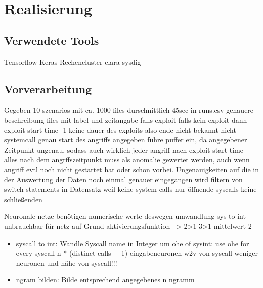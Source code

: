 
\chapter{Realisierung}\label{ch:realisierung}

\section{Verwendete Tools}
    Tensorflow Keras
    Rechencluster clara
    sysdig

\section{Vorverarbeitung}

    Gegeben 10 szenarios mit ca. 1000 files durschnittlich 45sec
    in runs.csv genauere beschreibung files mit label und zeitangabe falls exploit
    falls kein exploit dann exploit start time -1
    keine dauer des exploits also ende nicht bekannt 
    nicht systemcall genau start des angriffs angegeben 
    führe puffer ein, da angegebener Zeitpunkt ungenau, sodass auch wirklich jeder angriff nach exploit start time
    alles nach dem angrffszeitpunkt muss als anomalie gewertet werden, auch wenn angriff evtl noch nicht gestartet hat oder schon vorbei.
    Ungenauigkeiten auf die in der Auswertung der Daten noch einmal genauer eingegangen wird
    filtern von switch statements in Datensatz weil keine system calls
    nur öffnende syscalls keine schließenden

    Neuronale netze benötigen numerische werte deswegen umwandlung
    sys to int unbrauchbar für netz auf Grund aktivierungsfunktion --> 2>1 3>1 mittelwert 2
    \begin{itemize}
        \item syscall to int: Wandle Syscall name in Integer um
        \subitem ohe of sysint: use ohe for every syscall 
         n * (distinct calls + 1) eingabeneuronen 
        \subitem w2v von syscall
         weniger neuronen und nähe von syscall!!!
        \item ngram bilden: Bilde entsprechend angegebenes n ngramm
    \end{itemize}




